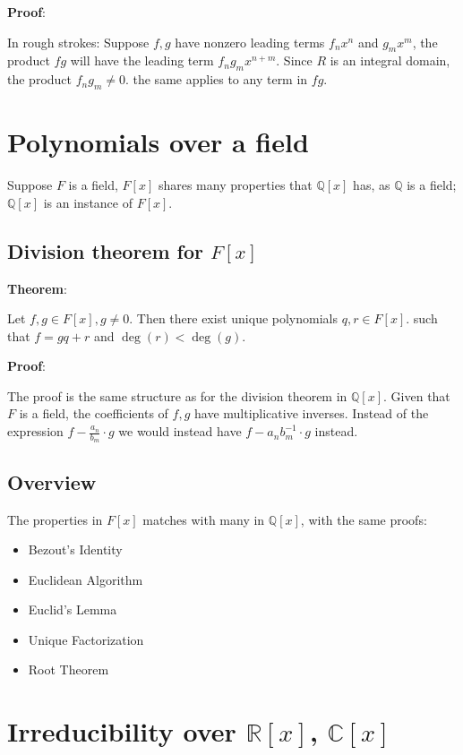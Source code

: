 \documentclass{article}
\begin{document}
\begin{multicols*}{2}
\textbf{Proof}:

In rough strokes: Suppose $f, g$ have nonzero leading terms $f_nx^n$ and $g_mx^m$, the product $fg$ will have the leading term $f_ng_mx^{n+m}$. Since $R$ is an integral domain, the product $f_ng_m \neq 0$. the same applies to any term in $fg$.

\section{Polynomials over a field}

Suppose $F$ is a field, $F[x]$ shares many properties that $\mathbb{Q}[x]$ has, as $\mathbb{Q}$ is a field; $\mathbb{Q}[x]$ is an instance of $F[x]$.

\subsection{Division theorem for $F[x]$}

\textbf{Theorem}:

Let $f,g \in F[x], g \neq 0$. Then there exist unique polynomials $q, r \in F[x]$. such that $f = gq+r$ and $\deg(r) < \deg(g)$.

\textbf{Proof}:

The proof is the same structure as for the division theorem in $\mathbb{Q}[x]$. Given that $F$ is a field, the coefficients of $f, g$ have multiplicative inverses. Instead of the expression $f - \frac{a_n}{b_m}\cdot g$ we would instead have $f - a_n b_m^{-1} \cdot g$ instead.

\subsection{Overview}

The properties in $F[x]$ matches with many in $\mathbb{Q}[x]$, with the same proofs:

\begin{itemize}
    \item Bezout's Identity
    \item Euclidean Algorithm
    \item Euclid's Lemma
    \item Unique Factorization
    \item Root Theorem
\end{itemize}

\section{Irreducibility over $\mathbb{R}[x]$, $\mathbb{C}[x]$}


\end{multicols*}
\end{document}

